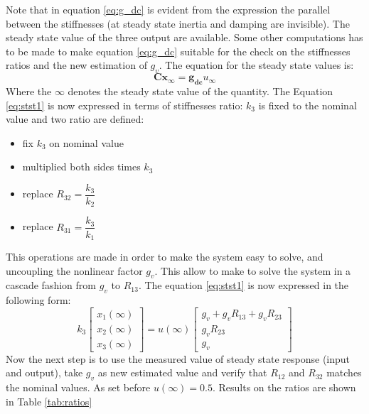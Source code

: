 \documentclass[twosided,a4paper]{article}           %
\begin{document}
Note that in equation \ref{eq:g_dc} is evident from the expression the parallel between the stiffnesses (at steady state inertia and damping are invisible).
The steady state value of the three output are available. Some other computations has to be made to make equation \ref{eq:g_dc} suitable for the check on the stiffnesses ratios and the new estimation of $g_v$. The equation for the steady state values is:
\begin{equation}
	\bm{C}\bm{x}_\infty = \bm{g_{dc}}u_\infty  
	\label{eq:stst1}
\end{equation}
Where the $\infty$ denotes the steady state value of the quantity. The Equation \ref{eq:stst1} is now expressed in terms of stiffnesses ratio: $k_3$ is fixed to the nominal value and two ratio are defined:\begin{itemize}
	\item fix $k_3$ on nominal value
	\item multiplied both sides times $k_3$
	\item replace $R_{32} = \dfrac{k_3}{k_2}$
	\item replace $R_{31} = \dfrac{k_3}{k_1}$
\end{itemize}
This operations are made in order to make the system easy to solve, and uncoupling the nonlinear factor $g_v$. This allow to make to solve the system in a cascade fashion from $g_v$ to $R_{13}$. The equation \ref{eq:stst1} is now expressed in the following form:
\begin{equation}
	\label{eq:stst2} 
	k_3 \left [\begin{array}{c}
	x_1(\infty) \\ 
	x_2(\infty) \\ 
	x_3(\infty) \end{array}  \right ] 
	=
	u(\infty)\left [\begin{array}{c}
	g_v + g_v R_{13} + g_v R_{23} \\ 
	g_v R_{23} \\ 
	g_v \end{array}  \right ] 
\end{equation}
Now the next step is to use the measured value of steady state response (input and output), take $g_v$ as new estimated value and verify that $R_{12}$ and $R_{32}$ matches the nominal values. As set before $u(\infty) = 0.5$.
Results on the ratios are shown in Table \ref{tab:ratios}
\end{document}
